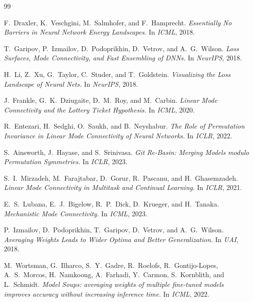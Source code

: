 \documentclass[11pt,a4paper]{article}
\begin{document}
\begin{thebibliography}{99}

F.\ Draxler, K.\ Veschgini, M.\ Salmhofer, and F.\ Hamprecht.
\textit{Essentially No Barriers in Neural Network Energy Landscapes.}
In \emph{ICML}, 2018.

T.\ Garipov, P.\ Izmailov, D.\ Podoprikhin, D.\ Vetrov, and A.\ G.\ Wilson.
\textit{Loss Surfaces, Mode Connectivity, and Fast Ensembling of DNNs.}
In \emph{NeurIPS}, 2018.

H.\ Li, Z.\ Xu, G.\ Taylor, C.\ Studer, and T.\ Goldstein.
\textit{Visualizing the Loss Landscape of Neural Nets.}
In \emph{NeurIPS}, 2018.

J.\ Frankle, G.\ K.\ Dziugaite, D.\ M.\ Roy, and M.\ Carbin.
\textit{Linear Mode Connectivity and the Lottery Ticket Hypothesis.}
In \emph{ICML}, 2020.

R.\ Entezari, H.\ Sedghi, O.\ Saukh, and B.\ Neyshabur.
\textit{The Role of Permutation Invariance in Linear Mode Connectivity of Neural Networks.}
In \emph{ICLR}, 2022.

S.\ Ainsworth, J.\ Hayase, and S.\ Srinivasa.
\textit{Git Re-Basin: Merging Models modulo Permutation Symmetries.}
In \emph{ICLR}, 2023.

S.\ I.\ Mirzadeh, M.\ Farajtabar, D.\ Gorur, R.\ Pascanu, and H.\ Ghasemzadeh.
\textit{Linear Mode Connectivity in Multitask and Continual Learning.}
In \emph{ICLR}, 2021.

E.\ S.\ Lubana, E.\ J.\ Bigelow, R.\ P.\ Dick, D.\ Krueger, and H.\ Tanaka.
\textit{Mechanistic Mode Connectivity.}
In \emph{ICML}, 2023.

P.\ Izmailov, D.\ Podoprikhin, T.\ Garipov, D.\ Vetrov, and A.\ G.\ Wilson.
\textit{Averaging Weights Leads to Wider Optima and Better Generalization.}
In \emph{UAI}, 2018.

M.\ Wortsman, G.\ Ilharco, S.\ Y.\ Gadre, R.\ Roelofs, R.\ Gontijo-Lopes, A.\ S.\ Morcos, H.\ Namkoong, A.\ Farhadi, Y.\ Carmon, S.\ Kornblith, and L.\ Schmidt.
\textit{Model Soups: averaging weights of multiple fine-tuned models improves accuracy without increasing inference time.}
In \emph{ICML}, 2022.


\end{thebibliography}
\end{document}
